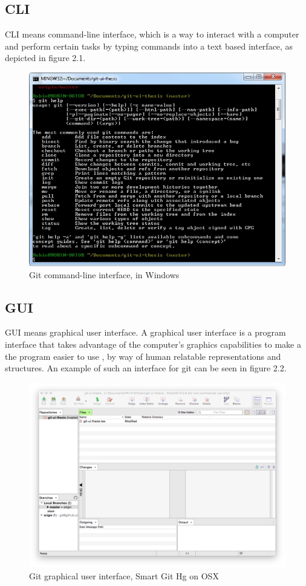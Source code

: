 \documentclass[a4paper,oneside]{bth} %
\begin{document}
			\subsection{CLI}
			CLI means command-line interface, which is a way to interact with a computer and perform certain tasks by typing commands into a text based interface, as depicted in figure 2.1.
			\begin{figure}[H]
				\centering
				\includegraphics[width=0.8\linewidth]{git-cli.jpg}
				\caption{Git command-line interface, in Windows}
				\label{fig:git-cli}
			\end{figure}
			
			\subsection{GUI}
			GUI means graphical user interface. A graphical user interface is a program interface that takes advantage of the computer's graphics capabilities to make a the program easier to use \cite{WhatIsGui}, by way of human relatable representations and structures. An example of such an interface for git can be seen in figure 2.2.
			\begin{figure}[H]
				\centering
				\includegraphics[width=0.8\linewidth]{git-gui.png}
				\caption{Git graphical user interface, Smart Git Hg on OSX}
				\label{fig:git-gui}
			\end{figure}
			
\end{document}
